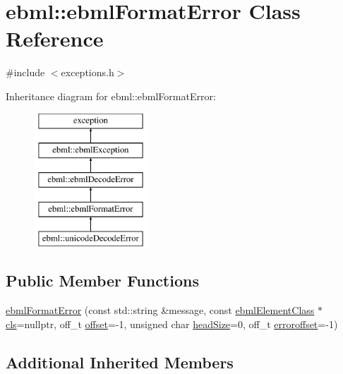 \hypertarget{classebml_1_1ebmlFormatError}{}\section{ebml\+:\+:ebml\+Format\+Error Class Reference}
\label{classebml_1_1ebmlFormatError}


{\ttfamily \#include $<$exceptions.\+h$>$}

Inheritance diagram for ebml\+:\+:ebml\+Format\+Error\+:\begin{figure}[H]
\begin{center}
\leavevmode
\includegraphics[height=5.000000cm]{classebml_1_1ebmlFormatError}
\end{center}
\end{figure}
\subsection*{Public Member Functions}
\begin{DoxyCompactItemize}
\item 
\mbox{\hyperlink{classebml_1_1ebmlFormatError_a49a8a445d4f385f34d79095504e2363d}{ebml\+Format\+Error}} (const std\+::string \&message, const \mbox{\hyperlink{classebml_1_1ebmlElementClass}{ebml\+Element\+Class}} $\ast$\mbox{\hyperlink{classebml_1_1ebmlDecodeError_a3568b4ea3cd5bd16b9510abfe269920f}{cls}}=nullptr, off\+\_\+t \mbox{\hyperlink{classebml_1_1ebmlDecodeError_ad32ac9b3dd52f1c11479085d9c665e0f}{offset}}=-\/1, unsigned char \mbox{\hyperlink{classebml_1_1ebmlDecodeError_a61a4d4856f0c779a1c216e45dc5a7c1e}{head\+Size}}=0, off\+\_\+t \mbox{\hyperlink{classebml_1_1ebmlDecodeError_acb525117e0109d9640fb5e8c546e9a02}{erroroffset}}=-\/1)
\end{DoxyCompactItemize}
\subsection*{Additional Inherited Members}


